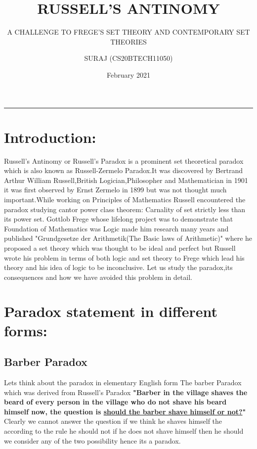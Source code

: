 \documentclass[a4paper]{article}
\title{\textbf{RUSSELL'S ANTINOMY}}
\subtitle{A CHALLENGE TO FREGE'S SET THEORY AND CONTEMPORARY SET THEORIES}
\author{SURAJ (CS20BTECH11050)}
\date{February 2021}
\begin{document}
\maketitle
\hrule
\section{Introduction:}
Russell's Antinomy or Russell's Paradox is a prominent set theoretical 
paradox which is also known as Russell-Zermelo Paradox.It was discovered
by Bertrand Arthur William Russell,British Logician,Philosopher and  Mathematician in 1901 it was first observed by Ernst Zermelo in 1899
but was not thought much important.While working on Principles of
Mathematics Russell encountered the paradox studying cantor power
class theorem: Carnality of set strictly less than its power set.
Gottlob Frege whose lifelong project was to demonstrate that 
Foundation of Mathematics was Logic made him research many years and
published "Grundgesetze der Arithmetik(The Basic laws of Arithmetic)"
where he proposed a set theory which was thought to be ideal and
perfect but Russell wrote his problem in terms of both logic and 
set theory to Frege which lead his theory and his idea of logic to
be inconclusive. Let us study the paradox,its consequences and how 
we have avoided this problem in detail.

\section{Paradox statement in different forms:}
\subsection{Barber Paradox}
Lets think about the paradox in elementary English form 
The barber Paradox which was derived from Russell's Paradox
\textbf{"Barber in the village shaves the beard of every person in 
the village who do not shave his beard himself now, the question is
\underline{should the barber shave himself or not?}"}
\\ 
Clearly we cannot answer the question if we think he shaves himself
the according to the rule he should not if he does not shave himself 
then he should we consider any of the two possibility hence its a 
paradox.
\end{document}
